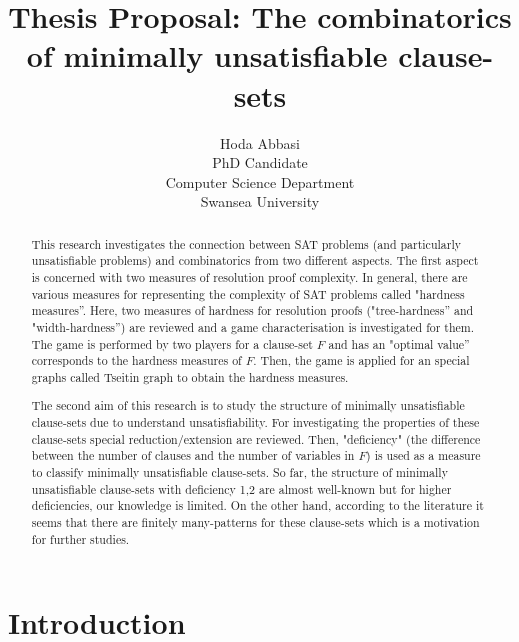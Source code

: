 \documentclass{report}
\begin{document}
\title{Thesis Proposal: The combinatorics of minimally unsatisfiable clause-sets
       }

\author{Hoda Abbasi\\
        PhD Candidate\\
        Computer Science Department\\
        Swansea University\\}
\maketitle


\begin{abstract}
This research investigates the connection between SAT problems (and particularly unsatisfiable problems) and combinatorics from two different aspects. The first aspect is concerned with two measures of resolution proof complexity. In general, there are various measures for representing the complexity of SAT problems called "hardness measures''. Here, two measures of hardness for resolution proofs ("tree-hardness'' and "width-hardness'') are reviewed and a game characterisation is investigated for them. The game is performed by two players for a clause-set $F$ and has an "optimal value'' corresponds to the hardness measures of $F$. Then, the game is applied for an special graphs called Tseitin graph to obtain the hardness measures.

The second aim of this research is to study the structure of minimally unsatisfiable clause-sets due to understand unsatisfiability. For investigating the properties of these clause-sets special reduction/extension are reviewed. Then, "deficiency" (the difference between the number of clauses and the number of variables in $F$) is used as a measure to classify minimally unsatisfiable clause-sets. So far, the structure of minimally unsatisfiable clause-sets with deficiency 1,2 are almost well-known but for higher deficiencies, our knowledge is limited. On the other hand, according to the literature it seems that there are finitely many-patterns for these clause-sets which is a motivation for further studies.
\end{abstract}

\tableofcontents
\chapter{Introduction}
\label{cha:intro}
\end{document}

